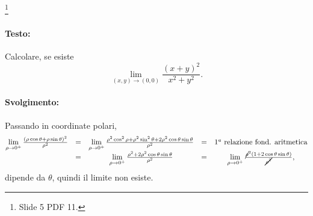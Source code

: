 \begin{example}\footnote{Slide 5 PDF 11.}
    \paragraph{Testo:} Calcolare, se esiste
    \begin{equation*}
        \lim\limits_{(x,y)\rightarrow(0,0)}\frac{(x+y)^2}{x^2+y^2}.
    \end{equation*}
    \paragraph{Svolgimento:} Passando in coordinate polari,
    \begin{equation*}
        \begin{matrix}
            \lim\limits_{\rho\rightarrow 0^+}\frac{(\rho\cos\theta+\rho\sin\theta)^2}{\rho^2}&=&\lim\limits_{\rho\rightarrow 0^+}\frac{\rho^2\cos^2\rho+\rho^2\sin^2\theta+2\rho^2\cos\theta\sin\theta}{\rho^2}&=& 1^a\text{ relazione fond. aritmetica}\\
            &=&\lim\limits_{\rho\rightarrow0^+}\frac{\rho^2+2\rho^2\cos\theta\sin\theta}{\rho^2}&=&\lim\limits_{\rho\rightarrow0^+}\frac{\cancel{\rho}^2(1+2\cos\theta\sin\theta)}{\cancel{\rho^2}},
        \end{matrix}
    \end{equation*}
    dipende da $\theta$, quindi il limite non esiste.
\end{example}

